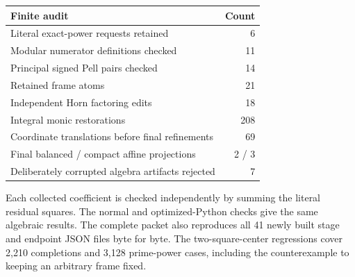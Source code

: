 \begin{center}\small
\begin{tabular}{@{}lr@{}}
\toprule Finite audit & Count \\ \midrule
Literal exact-power requests retained & 6 \\
Modular numerator definitions checked & 11 \\
Principal signed Pell pairs checked & 14 \\
Retained frame atoms & 21 \\
Independent Horn factoring edits & 18 \\
Integral monic restorations & 208 \\
Coordinate translations before final refinements & 69 \\
Final balanced / compact affine projections & 2 / 3 \\
Deliberately corrupted algebra artifacts rejected & 7 \\
\bottomrule\end{tabular}\end{center}
Each collected coefficient is checked independently by summing the literal residual squares.
The normal and optimized-Python checks give the same algebraic results.
The complete packet also reproduces all 41 newly built stage and endpoint JSON files byte for byte.
The two-square-center regressions cover 2,210 completions and 3,128 prime-power cases,
including the counterexample to keeping an arbitrary frame fixed.
